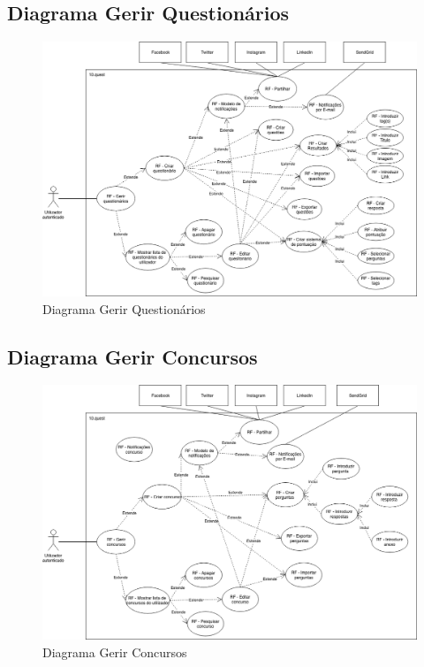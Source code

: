 \newpage

\subsection{Diagrama Gerir Questionários}
\label{d:quests}
\begin{figure}[ht!]
	\begin{center}
		\includegraphics[width=1\textwidth]{img/rf/gerir-quest}
		\caption{Diagrama Gerir Questionários}
		\label{fig:rf-gerir-quest}
	\end{center}
\end{figure}


\newpage

\subsection{Diagrama Gerir Concursos}
\label{d:concursos}
\begin{figure}[ht!]
	\begin{center}
		\includegraphics[width=1\textwidth]{img/rf/gerir-concurso}
		\caption{Diagrama Gerir Concursos}
		\label{fig:rf-gerir-concursos}
	\end{center}
\end{figure}


